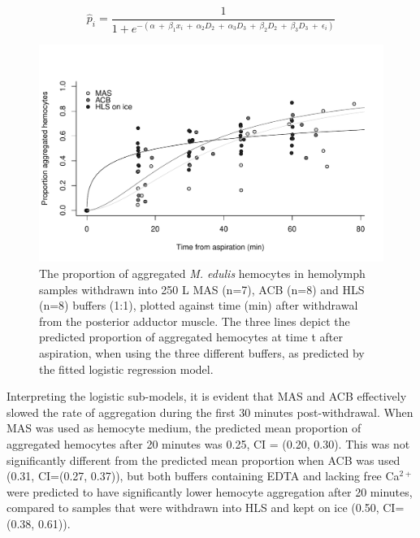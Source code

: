 \begin{equation}
\label{eq:logit}
\hat{p}_{i} = \dfrac{1}{1 + e^{-(\alpha \: + \: \beta_{1} x_{i} \: + \: \alpha_{2} D_{2} \: + \: \alpha_{3} D_{3} \: + \: \beta_{2} D_{2} \: + \: \beta_{3} D_{3} \: + \: \epsilon_{i})}}
\end{equation}

\begin{figure}[!ht]
    \centering
    \includegraphics[width=1.0\textwidth]{figures/Method development/prop_agg.pdf}
    \caption{The proportion of aggregated \emph{M. edulis} hemocytes in hemolymph samples withdrawn into 250 \micro L MAS (n=7), ACB (n=8) and HLS (n=8) buffers (1:1), plotted against time (min) after withdrawal from the posterior adductor muscle. The three lines depict the predicted proportion of aggregated hemocytes at time t after aspiration, when using the three different buffers, as predicted by the fitted logistic regression model.}
    \label{fig:aggregation}
\end{figure}

Interpreting the logistic sub-models, it is evident that MAS and ACB effectively slowed the rate of aggregation during the first 30 minutes post-withdrawal. When MAS was used as hemocyte medium, the predicted mean proportion of aggregated hemocytes after 20 minutes was 0.25, CI = (0.20, 0.30). This was not significantly different from the predicted mean proportion when ACB was used (0.31, CI=(0.27, 0.37)), but both buffers containing EDTA and lacking free Ca$^{2+}$ were predicted to have significantly lower hemocyte aggregation after 20 minutes, compared to samples that were withdrawn into HLS and kept on ice (0.50, CI=(0.38, 0.61)).

